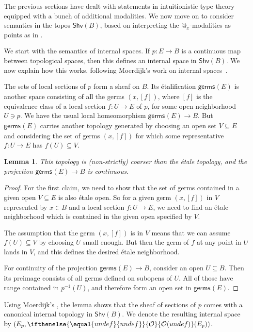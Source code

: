 \documentclass[reqno,11pt]{amsproc}
\makeatletter
\theoremstyle{plain}
\newtheorem{lemma}[theorem]{Lemma}
\theoremstyle{definition}
\newcommand{\cat}[1]{\mathsf{#1}}
\renewcommand{\to}[1][]{\xrightarrow{#1}}
\newcommand{\germs}[2]{\mathsf{germs}_{#2}({#1})}
\newcommand{\shv}{\cat{Shv}}
\newcommand{\pt}{x}
\newcommand{\Op}[1][undef]{\ifthenelse{\equal{#1}{undef}}{\mathcal{O}}{\mathcal{O}(#1)}}
\newcommand{\atsymbol}{{@}}
\newcommand{\at}[1][\pt]{\atsymbol_{#1}}
\numberwithin{equation}{section}
\makeatother
\begin{document}
The previous sections have dealt with statements in intuitionistic type theory equipped with a bunch of additional modalities. We now move on to consider semantics in the topos $\shv(B)$, based on interpreting the $\at$-modalities as points as in .

We start with the semantics of internal spaces. If $p : E \to B$ is a continuous map between topological spaces, then this defines an internal space in $\shv(B)$. We now explain how this works, following Moerdijk's work on internal spaces~\cite{moerdijk1984spaced}.

The sets of local sections of $p$ form a sheaf on $B$. Its \'etalification $\germs{E}{}$ is another space consisting of all the germs $(x,[f])$, where $[f]$ is the equivalence class of a local section $f\colon U\to E$ of $p$, for some open neighborhood $U\ni p$. We have the usual local homeomorphism $\germs{E}{} \to B$. But $\germs{E}{}$ carries another topology generated by choosing an open set $V\subseteq E$ and considering the set of germs $(x,[f])$ for which some representative $f\colon U\to E$ has $f(U)\subseteq V$.

\begin{lemma}
	This topology is (non-strictly) coarser than the \'etale topology, and the projection $\germs{E}{} \to B$ is continuous.
\end{lemma}

\begin{proof}
	For the first claim, we need to show that the set of germs contained in a given open $V \subseteq E$ is also \'etale open. So for a given germ $(x,[f])$ in $V$ represented by $x \in B$ and a local section $f : U \to E$, we need to find an \'etale neighborhood which is contained in the given open specified by $V$.

	The assumption that the germ $(x,[f])$ is in $V$ means that we can assume $f(U) \subseteq V$ by choosing $U$ small enough. But then the germ of $f$ at any point in $U$ lands in $V$, and this defines the desired \'etale neighborhood.

	For continuity of the projection $\germs{E}{} \to B$, consider an open $U \subseteq B$. Then its preimage consists of all germs defined on subopens of $U$. All of those have range contained in $p^{-1}(U)$, and therefore form an open set in $\germs{E}{}$.
\end{proof}

Using Moerdijk's , the lemma shows that the sheaf of sections of $p$ comes with a canonical internal topology in $\shv(B)$. We denote the resulting internal space by $(E_p, \Op(E_p))$.
\end{document}
